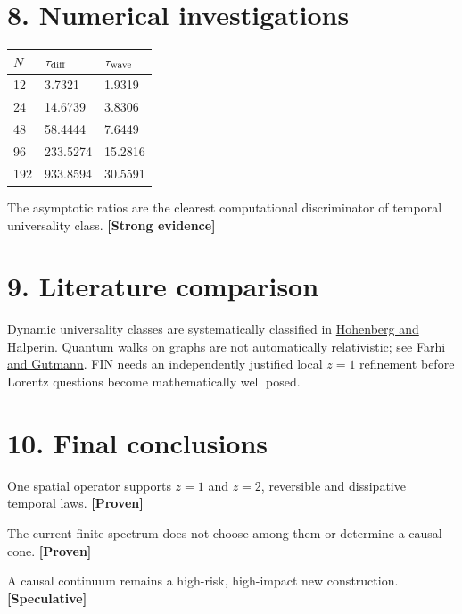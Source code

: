 \documentclass[11pt,a4paper,openany]{report}
\newcommand{\statusProven}{\textcolor{fingreen}{[Proven]}}
\newcommand{\statusStrong}{\textcolor{finblue}{[Strong evidence]}}
\newcommand{\statusSpeculative}{\textcolor{finorange}{[Speculative]}}
\begin{document}
\section{8. Numerical investigations}

\begin{center}
\begingroup\small
\setlength{\tabcolsep}{3.5pt}
\renewcommand{\arraystretch}{1.16}
\begin{longtable}{@{}p{}p{}p{}@{}}
\toprule
\textbf{\(N\)} & \textbf{\(\tau_{\rm diff}\)} & \textbf{\(\tau_{\rm wave}\)} \\
\midrule
\endhead
12 & 3.7321 & 1.9319 \\
24 & 14.6739 & 3.8306 \\
48 & 58.4444 & 7.6449 \\
96 & 233.5274 & 15.2816 \\
192 & 933.8594 & 30.5591 \\
\bottomrule
\end{longtable}
\endgroup
\end{center}

The asymptotic ratios are the clearest computational discriminator of temporal universality class. \textbf{\statusStrong{}}

\section{9. Literature comparison}

Dynamic universality classes are systematically classified in \href{https://doi.org/10.1103/RevModPhys.49.435}{Hohenberg and Halperin}. Quantum walks on graphs are not automatically relativistic; see \href{https://arxiv.org/abs/quant-ph/9706062}{Farhi and Gutmann}. FIN needs an independently justified local \(z=1\) refinement before Lorentz questions become mathematically well posed.

\section{10. Final conclusions}

One spatial operator supports \(z=1\) and \(z=2\), reversible and dissipative temporal laws. \textbf{\statusProven{}}

The current finite spectrum does not choose among them or determine a causal cone. \textbf{\statusProven{}}

A causal continuum remains a high-risk, high-impact new construction. \textbf{\statusSpeculative{}}
\end{document}
